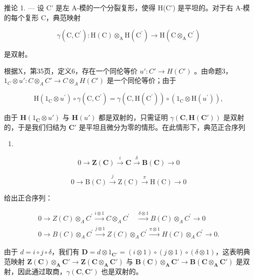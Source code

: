 推论 1. --- 设 C' 是左 A-模的一个分裂复形，使得 H(C') 是平坦的。对于右 A-模的每个复形 C，典范映射

\[
\gamma (\mathrm{C}, \mathrm{C} ^ {\prime}): \mathrm{H} (\mathrm{C}) \otimes_ {\mathrm{A}} \mathrm{H} (\mathrm{C} ^ {\prime}) \rightarrow \mathrm{H} (\mathrm{C} \otimes_ {\mathrm{A}} \mathrm{C} ^ {\prime})
\]

是双射。

根据X，第35页，定义6，存在一个同伦等价 \(u': C' \to H(C')\) 。由命题3， \(1_{C} \otimes u': C \otimes_{A} C' \to C \otimes_{A} H(C')\) 是一个同伦等价；由于

\[
\mathrm{H} \left(1 _ {\mathrm{C}} \otimes u ^ {\prime}\right) \circ \gamma (\mathrm{C}, \mathrm{C} ^ {\prime}) = \gamma (\mathrm{C}, \mathrm{H} (\mathrm{C} ^ {\prime})) \circ \left(1 _ {\mathrm{C}} \otimes \mathrm{H} (u ^ {\prime})\right),
\]

由于 \(\mathbf{H}(1_{\mathbf{C}} \otimes u')\) 与 \(\mathbf{H}(u')\) 都是双射的，只需证明 \(\gamma(\mathbf{C}, \mathbf{H}(\mathbf{C}'))\) 是双射的，于是我们归结为 \(\mathbf{C}'\) 是平坦且微分为零的情形。在此情形下，典范正合序列

\begin{enumerate}
\def\labelenumi{(\Roman{enumi})}
\tightlist
\item
\end{enumerate}

\[
0 \to \mathbf {Z} (\mathbf {C}) \xrightarrow {i} \mathbf {C} \xrightarrow {\delta} \mathbf {B} (\mathbf {C}) \to 0\tag{II}
\]

\[
0 \rightarrow \mathrm{B} (\mathrm{C}) \xrightarrow {j} \mathrm{Z} (\mathrm{C}) \xrightarrow {\pi} \mathrm{H} (\mathrm{C}) \rightarrow 0
\]

给出正合序列：

\[
\begin{array}{l} 0 \longrightarrow Z (C) \otimes_ {A} C ^ {\prime} \xrightarrow {i \otimes 1} C \otimes_ {A} C ^ {\prime} \quad \xrightarrow {\delta \otimes 1} B (C) \otimes_ {A} C ^ {\prime} \longrightarrow 0 \\ 0 \longrightarrow B (C) \otimes_ {A} C ^ {\prime} \xrightarrow {j \otimes 1} Z (C) \otimes_ {A} C ^ {\prime} \xrightarrow {\pi \otimes 1} H (C) \otimes_ {A} C ^ {\prime} \longrightarrow 0. \end{array}
\]

由于 \(d = i \circ j \circ \delta\)，我们有 \(\mathbf{D} = d \otimes 1_{\mathbf{C}'} = (i \otimes 1) \circ (j \otimes 1) \circ (\delta \otimes 1)\)，这表明典范映射 \(\mathbf{Z}(\mathbf{C}) \otimes_{\mathbf{A}} \mathbf{C}' \to \mathbf{Z}(\mathbf{C} \otimes_{\mathbf{A}} \mathbf{C}')\) 与 \(\mathbf{B}(\mathbf{C}) \otimes_{\mathbf{A}} \mathbf{C}' \to \mathbf{B}(\mathbf{C} \otimes_{\mathbf{A}} \mathbf{C}')\) 是双射，因此通过取商，\(\gamma(\mathbf{C}, \mathbf{C}')\) 也是双射的。

